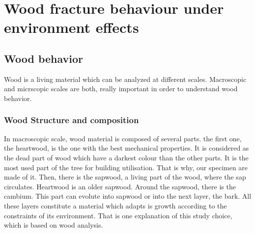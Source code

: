 
\chapter{Wood fracture behaviour under environment effects}
\label{Chapter1}


\section{Wood behavior}


Wood is a living material which can be analyzed at different scales. Macroscopic and micrscopic scales are both, really important in order to understand wood behavior.

\subsection{Wood Structure and composition}

In macroscopic scale, wood material is composed of several parts. the first one, the heartwood, is the one with the best mechanical properties. It is considered as the dead part of wood which have a darkest colour than the other parts. It is the most used part of the tree for building utilisation. That is why, our specimen are made of it. Then, there is the sapwood, a living part of the wood, where the sap circulates. Heartwood is an older sapwood. Around the sapwood, there is the cambium. This part can evolute into sapwood or into the next layer, the bark. All these layers constitute a material which adapts is growth according to the constraints of its environment. That is one explanation of this study choice, which is based on wood analysis.

